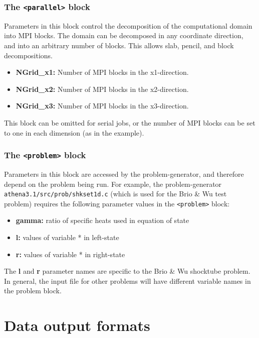 \subsubsection{The {\tt <parallel>} block}

Parameters in this block control the decomposition of the computational
domain into MPI blocks.  The domain can be decomposed in any coordinate
direction, and into an arbitrary number of blocks.  This allows slab, pencil,
and block decompositions.
\begin{itemize}
\item {\bf NGrid\_x1:} Number of MPI blocks in the x1-direction.
\item {\bf NGrid\_x2:} Number of MPI blocks in the x2-direction.
\item {\bf NGrid\_x3:} Number of MPI blocks in the x3-direction.
\end{itemize}
This block can be omitted for serial jobs, or
the number of MPI blocks can be set to one in each dimension (as in the
example).

\subsubsection{The {\tt <problem>} block}

Parameters in this block are accessed by the problem-generator,
and therefore depend on the problem being run.  For example, the 
problem-generator {\tt athena3.1/src/prob/shkset1d.c}
(which is used for the Brio \& Wu test problem)
requires the following parameter values in the {\tt <problem>} block:
\begin{itemize}
\item {\bf gamma:} ratio of specific heats used in equation of state
\item {\bf *l:} values of variable * in left-state
\item {\bf *r:} values of variable * in right-state
\end{itemize}
The {\bf *l} and {\bf *r} parameter names are specific to the Brio \&
Wu shocktube problem.  In general, the input file for other problems
will have different variable names in the problem block.

\section{Data output formats}

